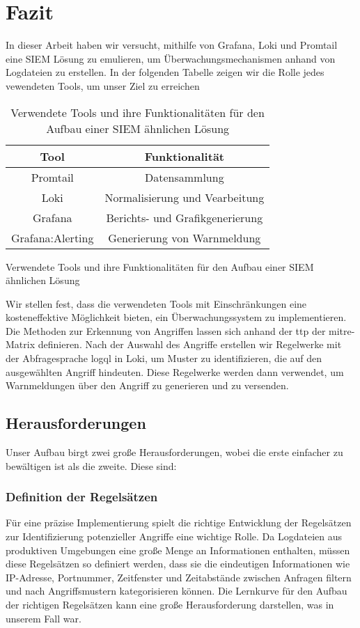 \section{Fazit}

In dieser Arbeit haben wir versucht, mithilfe von Grafana, Loki und Promtail eine \gls{SIEM} Lösung zu emulieren, um Überwachungsmechanismen anhand von Logdateien zu erstellen. In der folgenden Tabelle zeigen wir die Rolle jedes vewendeten Tools, um unser Ziel zu erreichen

\begin{table}[h]
    \centering
    \begin{tabular}{|c|c|}
    \hline
    \textbf{Tool}    & \textbf{Funktionalität}         \\ \hline
    Promtail         & Datensammlung                   \\ \hline
    Loki             & Normalisierung und Vearbeitung  \\ \hline
    Grafana          & Berichts- und Grafikgenerierung \\ \hline
    Grafana:Alerting & Generierung von Warnmeldung     \\ \hline
    \end{tabular}
    \caption{Verwendete Tools und ihre Funktionalitäten für den Aufbau einer \gls{SIEM} ähnlichen Lösung}
    {Verwendete Tools und ihre Funktionalitäten für den Aufbau einer \gls{SIEM} ähnlichen Lösung}
    \label{tab:VerewendeteTools}
\end{table}

Wir stellen fest, dass die verwendeten Tools mit Einschränkungen eine kosteneffektive Möglichkeit bieten, ein Überwachungssystem zu implementieren. Die Methoden zur Erkennung von Angriffen lassen sich anhand der \gls{ttp} der \gls{mitre}-Matrix definieren. Nach der Auswahl des Angriffe erstellen wir Regelwerke mit der Abfragesprache \gls{logql} in Loki, um Muster zu identifizieren, die auf den ausgewählten Angriff hindeuten. Diese Regelwerke werden dann verwendet, um Warnmeldungen über den Angriff zu generieren und zu versenden.

\subsection{Herausforderungen}
Unser Aufbau birgt zwei große Herausforderungen, wobei die erste einfacher zu bewältigen ist als die zweite. Diese sind:

\subsubsection{Definition der Regelsätzen}
Für eine präzise Implementierung spielt die richtige Entwicklung der Regelsätzen zur Identifizierung potenzieller Angriffe eine wichtige Rolle. Da Logdateien aus produktiven Umgebungen eine große Menge an Informationen enthalten, müssen diese Regelsätzen so definiert werden, dass sie die eindeutigen Informationen wie IP-Adresse, Portnummer, Zeitfenster und Zeitabstände zwischen Anfragen filtern und nach Angriffsmustern kategorisieren können. Die Lernkurve für den Aufbau der richtigen Regelsätzen kann eine große Herausforderung darstellen, was in unserem Fall war. 

